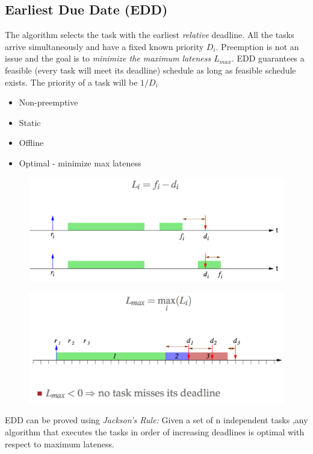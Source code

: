 \documentclass{hw}
\begin{document}
\subsection{Earliest Due Date (EDD)}
The algorithm selects the task with the earliest \emph{relative} deadline. All
the tasks arrive simultaneously and have a fixed known priority $D_{i}$. 
Preemption is not an issue and the goal is to \emph{minimize the maximum 
lateness $L_{max}$}. EDD guarantees a feasible (every task will meet its deadline)
schedule as long as feasible schedule exists. The priority of a task will be 
$1/D_{i}$
\begin{itemize}
  \item Non-preemptive
  \item Static
  \item Offline
  \item Optimal - minimize max lateness
\end{itemize}

\begin{figure}[H]
  \centering
  \includegraphics[scale=.6]{edd}
\end{figure}
\begin{figure}[H]
  \centering
  \includegraphics[scale=.6]{edd2}
\end{figure}
EDD can be proved using \emph{Jackson's Rule:} Given a set of n independent tasks
,any algorithm that executes the tasks in order of increasing deadlines is optimal
with respect to maximum lateness.
\end{document}
